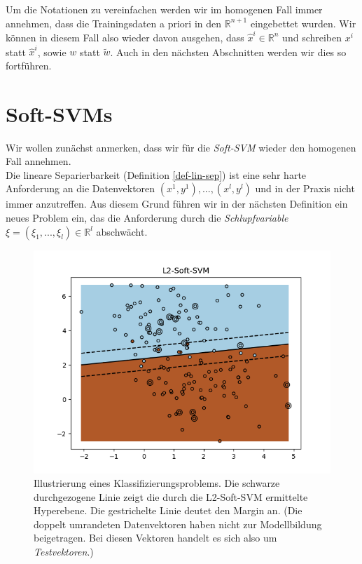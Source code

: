 Um die Notationen zu vereinfachen werden wir im homogenen Fall immer annehmen, dass die Trainingsdaten a priori in den $\mathbb{R}^{n+1}$ eingebettet wurden. Wir können in diesem Fall also wieder davon ausgehen, dass $\hat{x}^i \in \mathbb{R}^n$ und schreiben $x^i$ statt $\hat{x}^i$, sowie $w$ statt $\tilde{w}$. Auch in den nächsten Abschnitten werden wir dies so fortführen.

\section{Soft-SVMs}
Wir wollen zunächst anmerken, dass wir für die \emph{Soft-SVM} wieder den homogenen Fall annehmen. \\

Die lineare Separierbarkeit (Definition \ref{def-lin-sep}) ist eine sehr harte Anforderung an die Datenvektoren $(x^1,y^1),...,(x^l,y^l)$ und in der Praxis nicht immer anzutreffen. Aus diesem Grund führen wir in der nächsten Definition ein neues Problem ein, das die Anforderung durch die \emph{Schlupfvariable} $\xi = (\xi_1 ,...,\xi_l) \in \mathbb{R}^l$ abschwächt.

\begin{figure}[h]
	\centering
	\includegraphics[scale=0.90]{abbildungen/softsvm_ex1.png}
	\caption{Illustrierung eines Klassifizierungsproblems. Die schwarze durchgezogene Linie zeigt die durch die L2-Soft-SVM ermittelte Hyperebene. Die gestrichelte Linie deutet den Margin an. (Die doppelt umrandeten Datenvektoren haben nicht zur Modellbildung beigetragen. Bei diesen Vektoren handelt es sich also um \emph{Testvektoren}.)}
	\label{img:softsvm}
\end{figure}


